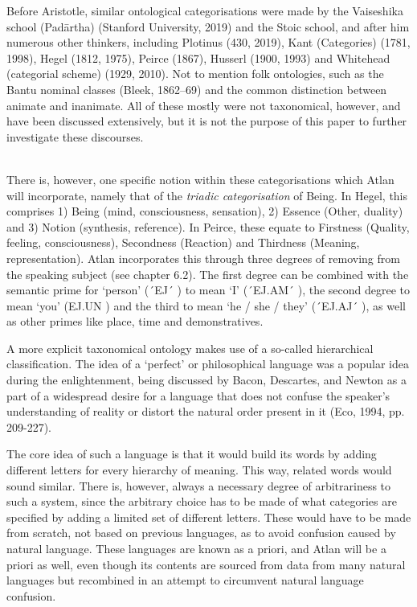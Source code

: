 Before Aristotle, similar ontological categorisations were made by the Vaiseshika school (Padārtha) (Stanford University, 2019) and the Stoic school, and after him numerous other thinkers, including Plotinus (430, 2019), Kant (Categories) (1781, 1998), Hegel  (1812, 1975), Peirce (1867), Husserl (1900, 1993) and Whitehead (categorial scheme) (1929, 2010). Not to mention folk ontologies, such as the Bantu nominal classes (Bleek, 1862–69) and the common distinction between animate and inanimate. All of these mostly were not taxonomical, however, and have been discussed extensively, but it is not the purpose of this paper to further investigate these discourses.  

\phantom{.}\\

There is, however, one specific notion within these categorisations which Atlan will incorporate, namely that of the {\it triadic categorisation} of Being. In Hegel, this comprises 1) Being (mind, consciousness, sensation), 2) Essence (Other, duality) and 3) Notion (synthesis, reference). In Peirce, these equate to Firstness (Quality, feeling, consciousness), Secondness (Reaction) and Thirdness (Meaning, representation). Atlan incorporates this through three degrees of removing from the speaking subject (see chapter 6.2). The first degree can be combined with the semantic prime for ‘person’ (´EJ´ \ej) to mean ‘I’ (´EJ.AM´ \ej \am), the second degree to mean ‘you’ (EJ.UN \ej \un) and the third to mean ‘he / she / they’ (´EJ.AJ´ \ej \aj), as well as other primes like place, time and demonstratives. 

\vspace{-0.1cm}
A more explicit taxonomical ontology makes use of a so-called hierarchical classification. The idea of a ‘perfect’ or philosophical language was a popular idea during the enlightenment, being discussed by Bacon, Descartes, and Newton as a part of a widespread desire for a language that does not confuse the speaker’s understanding of reality or distort the natural order present in it (Eco, 1994, pp. 209-227). 

The core idea of such a language is that it would build its words by adding different letters for every hierarchy of meaning. This way, related words would sound similar. There is, however, always a necessary degree of arbitrariness to such a system, since the arbitrary choice has to be made of what categories are specified by adding a limited set of different letters. These would have to be made from scratch, not based on previous languages, as to avoid confusion caused by natural language. These languages are known as a priori, and Atlan will be a priori as well, even though its contents are sourced from data from many natural languages but recombined in an attempt to circumvent natural language confusion.  

